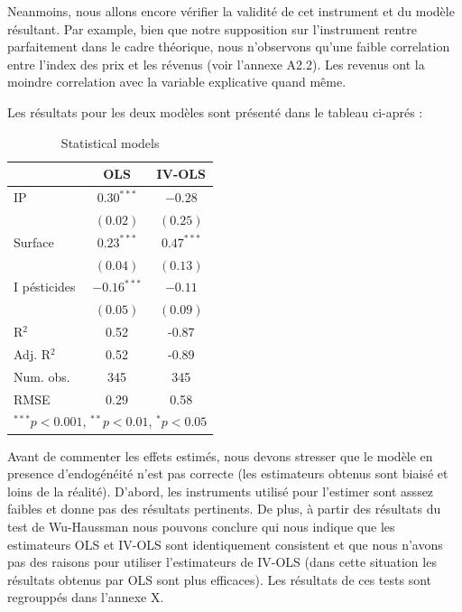 \documentclass[11pt,]{article}
\begin{document}
Neanmoins, nous allons encore vérifier la validité de cet instrument et
du modèle résultant. Par example, bien que notre supposition sur
l'instrument rentre parfaitement dans le cadre théorique, nous
n'observons qu'une faible correlation entre l'index des prix et les
révenus (voir l'annexe A2.2). Les revenus ont la moindre correlation
avec la variable explicative quand même.

Les résultats pour les deux modèles sont présenté dans le tableau
ci-aprés :

\FloatBarrier

\begin{table}[!htbp]
\begin{center}
\begin{tabular}{l c c }
\hline
 & OLS & IV-OLS \\
\hline
IP           & $0.30^{***}$  & $-0.28$      \\
             & $(0.02)$      & $(0.25)$     \\
Surface      & $0.23^{***}$  & $0.47^{***}$ \\
             & $(0.04)$      & $(0.13)$     \\
I pésticides & $-0.16^{***}$ & $-0.11$      \\
             & $(0.05)$      & $(0.09)$     \\
\hline
R$^2$        & 0.52          & -0.87        \\
Adj. R$^2$   & 0.52          & -0.89        \\
Num. obs.    & 345           & 345          \\
RMSE         & 0.29          & 0.58         \\
\hline
\multicolumn{3}{l}{\scriptsize{$^{***}p<0.001$, $^{**}p<0.01$, $^*p<0.05$}}
\end{tabular}
\caption{Statistical models}
\label{table : ols et ivols}
\end{center}
\end{table}

\FloatBarrier

Avant de commenter les effets estimés, nous devons stresser que le
modèle en presence d'endogénéité n'est pas correcte (les estimateurs
obtenus sont biaisé et loins de la réalité). D'abord, les instruments
utilisé pour l'estimer sont asssez faibles et donne pas des résultats
pertinents. De plus, à partir des résultats du test de Wu-Haussman nous
pouvons conclure qui nous indique que les estimateurs OLS et IV-OLS sont
identiquement consistent et que nous n'avons pas des raisons pour
utiliser l'estimateurs de IV-OLS (dans cette situation les résultats
obtenus par OLS sont plus efficaces). Les résultats de ces tests sont
regrouppés dans l'annexe X.
\end{document}
